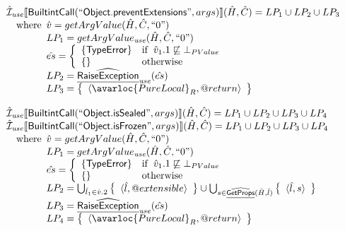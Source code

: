 \[\begin{array}{l}
\aI_{\it use}\lbr \SF{BuiltintCall}(``\SF{Object.preventExtensions}",args)\rbr(\hat{H},\hat{C}) = LP_1 \cup LP_2 \cup LP_3\\
\quad\wherec{
  \hat{v} = getArgValue(\hat{H}, \hat{C}, ``0")\\
  LP_1 = getArgValue_{\it use}(\hat{H}, \hat{C}, ``0")\\
  \hat{es} = \left\{\begin{array}{ll}
      \{ \SF{TypeError} \}
      & \ifc{\hat{v}_1.1 \not\sqsubseteq \bot_{PValue}}\\
      \set{} & \owc
    \end{array}\right.\\
  LP_2 = \ahf{RaiseException}_{\it use}(\hat{es})\\ 
  LP_3 = \set{\langle\avarloc{PureLocal}_R,\varprop{return}\rangle}\\
  }\\
\\

\aI_{\it use}\lbr \SF{BuiltintCall}(``\SF{Object.isSealed}",args)\rbr(\hat{H},\hat{C}) = LP_1 \cup LP_2 \cup LP_3 \cup LP_4\\
\aI_{\it use}\lbr \SF{BuiltintCall}(``\SF{Object.isFrozen}",args)\rbr(\hat{H},\hat{C}) = LP_1 \cup LP_2 \cup LP_3 \cup LP_4\\
\quad\wherec{
  \hat{v} = getArgValue(\hat{H}, \hat{C}, ``0")\\
  LP_1 = getArgValue_{\it use}(\hat{H}, \hat{C}, ``0")\\
  \hat{es} = \left\{\begin{array}{ll}
      \{ \SF{TypeError} \}
      & \ifc{\hat{v}_1.1 \not\sqsubseteq \bot_{PValue}}\\
      \set{} & \owc
    \end{array}\right.\\
  LP_2 = \bigcup_{\hat{l}_1 \in \hat{v}.2} \set{\langle \hat{l},\varprop{extensible}\rangle} \cup
    \bigcup_{s \in \ahf{GetProps}(\hat{H}, \hat{l})}  \set{\langle \hat{l}, s\rangle}\\
  LP_3 = \ahf{RaiseException}_{\it use}(\hat{es})\\ 
  LP_4 = \set{\langle\avarloc{PureLocal}_R,\varprop{return}\rangle}\\
  }\\
\\



\end{array}\]

